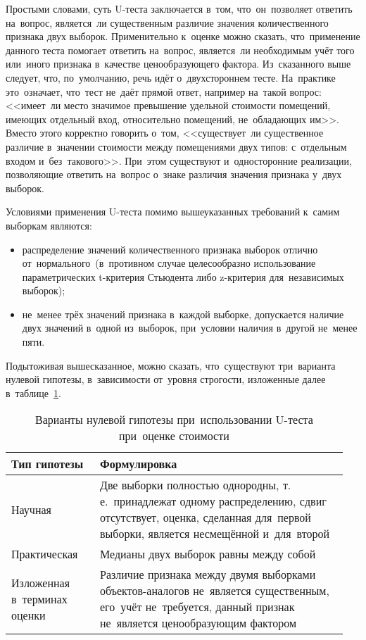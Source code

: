 \documentclass[]{scrartcl}
\begin{document}
Простыми словами, суть U-теста заключается в~том, что~он~позволяет ответить на~вопрос, является~ли существенным различие значения количественного признака двух выборок. Применительно к~оценке можно сказать, что~применение данного теста помогает ответить на~вопрос, является~ли необходимым учёт того или~иного признака в~качестве ценообразующего фактора. Из~сказанного выше следует, что, по~умолчанию, речь идёт о~двухстороннем тесте. На~практике это~означает, что~тест не~даёт прямой ответ, например на~такой вопрос: <<имеет~ли место значимое превышение удельной стоимости помещений, имеющих отдельный вход, относительно помещений, не~обладающих им>>. Вместо этого корректно говорить о~том, <<существует~ли существенное различие в~значении стоимости между помещениями двух типов: с~отдельным входом и~без~такового>>. При~этом существуют и~односторонние реализации, позволяющие ответить на~вопрос о~знаке различия значения признака у~двух выборок.

Условиями применения U-теста помимо вышеуказанных требований к~самим выборкам являются:
\begin{itemize}
	\item распределение значений количественного признака выборок отлично от~нормального~(в~противном случае целесообразно использование параметрических t-критерия Стьюдента либо z-критерия для~независимых выборок);
	\item не~менее трёх значений признака в~каждой выборке, допускается наличие двух значений в~одной из~выборок, при~условии наличия в~другой не~менее пяти.
	\end{itemize}
Подытоживая вышесказанное, можно сказать, что~существуют три~варианта нулевой гипотезы, в~зависимости от~уровня строгости, изложенные далее в~таблице~\ref{tab:nul-hypothesis-variants}.
\begin{table}[ht]
	\caption{Варианты нулевой гипотезы при~использовании U-теста при~оценке стоимости}  \label{tab:nul-hypothesis-variants}
	\centering
	\begin{tabularx}{\textwidth}{p{0.25\linewidth} p{0.7\linewidth}} 
		\hline
		Тип гипотезы&Формулировка\\
		 \hline
		Научная&Две выборки полностью однородны, т.\,е.~принадлежат одному распределению, сдвиг отсутствует, оценка, сделанная для~первой выборки, является несмещённой и~для~второй\\
		 \hline
		Практическая&Медианы двух выборок равны между собой\\
		 \hline
		Изложенная в~терминах оценки&Различие признака между двумя выборками объектов-аналогов не~является существенным, его~учёт не~требуется, данный признак не~является ценообразующим фактором\\ \hline
	\end{tabularx}
\end{table}
\end{document}
